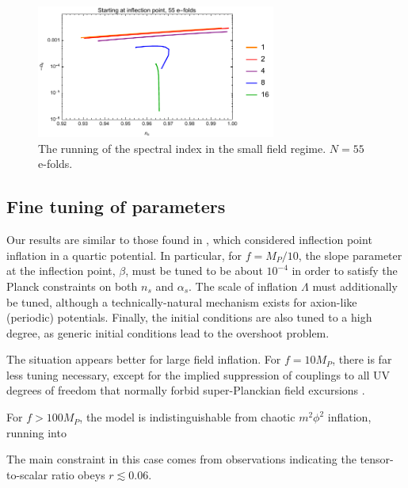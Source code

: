 \documentclass[aps,amsfonts,amsmath,prd,preprint,nofootinbib,superscriptaddress]{revtex4}
\newcommand{\Mp}{{M_{P}}}
\begin{document}
\begin{figure}[!h]
  \centering
    \includegraphics[width=0.7\textwidth]{figures/alphasvsnsplot.pdf}
    \caption{The running of the spectral index in the small field regime.  $N = 55$ e-folds.}
\end{figure}



















\subsection{Fine tuning of parameters}
Our results are similar to those found in \cite{Musoke:2017frr}, which considered inflection point inflation in a quartic potential.  In particular, for $f = \Mp/10$, the slope parameter at the inflection point, $\beta$, must be
tuned to be about $10^{-4}$ in order to satisfy the Planck constraints on both $n_s$ and $\alpha_s$.  The scale of inflation $\Lambda$ must additionally be tuned, although a technically-natural mechanism exists for axion-like (periodic) potentials.  Finally, the initial conditions are also tuned to a high degree, as generic initial conditions lead to the overshoot problem.

The situation appears better for large field inflation.
For $f = 10 \Mp$, there is far less tuning necessary, except for the implied suppression of couplings to all UV degrees of freedom that normally forbid super-Planckian field excursions \cite{swampland, monodromy}.

For $f > 100 \Mp$, the model is indistinguishable from chaotic $m^2\phi^2$ inflation, running into  

The main constraint in this case comes from observations indicating the tensor-to-scalar ratio obeys $r \lesssim 0.06$.
\end{document}
